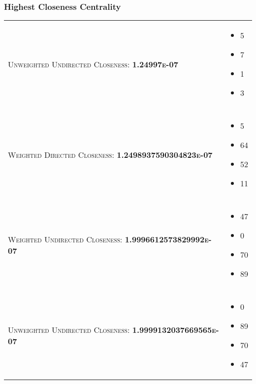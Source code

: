 \documentclass{article}
\newcommand{\br}{\multicolumn{2}{c}{} \\}
\begin{document}
\subsubsection{Highest Closeness Centrality}
\begin{tabular}{l|p{9.5cm}}
    \textsc{Unweighted Undirected Closeness: \textbf{1.24997e-07}} & \begin{itemize}
        \item 5
        \item 7
        \item 1
        \item 3
    \end{itemize} \\

    \br

    \textsc{Weighted Directed Closeness: \textbf{1.2498937590304823e-07}} & \begin{itemize}
        \item 5
        \item 64
        \item 52
        \item 11
    \end{itemize} \\

    \br

    \textsc{Weighted Undirected Closeness: \textbf{1.9996612573829992e-07}} & \begin{itemize}
        \item 47
        \item 0
        \item 70
        \item 89
    \end{itemize} \\

    \br

    \textsc{Unweighted Undirected Closeness: \textbf{1.9999132037669565e-07}} & \begin{itemize}
        \item 0
        \item 89
        \item 70
        \item 47
    \end{itemize} \\
\end{tabular}
\end{document}
